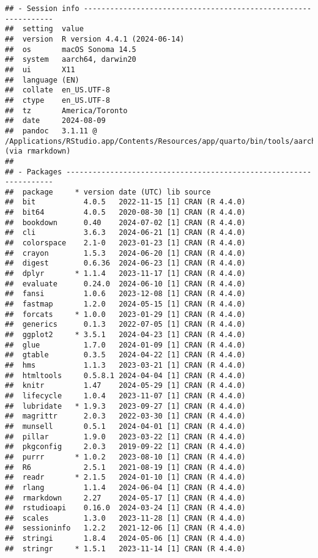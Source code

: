 \documentclass[
]{book}
\begin{document}
\begin{verbatim}
## - Session info ---------------------------------------------------------------
##  setting  value
##  version  R version 4.4.1 (2024-06-14)
##  os       macOS Sonoma 14.5
##  system   aarch64, darwin20
##  ui       X11
##  language (EN)
##  collate  en_US.UTF-8
##  ctype    en_US.UTF-8
##  tz       America/Toronto
##  date     2024-08-09
##  pandoc   3.1.11 @ /Applications/RStudio.app/Contents/Resources/app/quarto/bin/tools/aarch64/ (via rmarkdown)
## 
## - Packages -------------------------------------------------------------------
##  package     * version date (UTC) lib source
##  bit           4.0.5   2022-11-15 [1] CRAN (R 4.4.0)
##  bit64         4.0.5   2020-08-30 [1] CRAN (R 4.4.0)
##  bookdown      0.40    2024-07-02 [1] CRAN (R 4.4.0)
##  cli           3.6.3   2024-06-21 [1] CRAN (R 4.4.0)
##  colorspace    2.1-0   2023-01-23 [1] CRAN (R 4.4.0)
##  crayon        1.5.3   2024-06-20 [1] CRAN (R 4.4.0)
##  digest        0.6.36  2024-06-23 [1] CRAN (R 4.4.0)
##  dplyr       * 1.1.4   2023-11-17 [1] CRAN (R 4.4.0)
##  evaluate      0.24.0  2024-06-10 [1] CRAN (R 4.4.0)
##  fansi         1.0.6   2023-12-08 [1] CRAN (R 4.4.0)
##  fastmap       1.2.0   2024-05-15 [1] CRAN (R 4.4.0)
##  forcats     * 1.0.0   2023-01-29 [1] CRAN (R 4.4.0)
##  generics      0.1.3   2022-07-05 [1] CRAN (R 4.4.0)
##  ggplot2     * 3.5.1   2024-04-23 [1] CRAN (R 4.4.0)
##  glue          1.7.0   2024-01-09 [1] CRAN (R 4.4.0)
##  gtable        0.3.5   2024-04-22 [1] CRAN (R 4.4.0)
##  hms           1.1.3   2023-03-21 [1] CRAN (R 4.4.0)
##  htmltools     0.5.8.1 2024-04-04 [1] CRAN (R 4.4.0)
##  knitr         1.47    2024-05-29 [1] CRAN (R 4.4.0)
##  lifecycle     1.0.4   2023-11-07 [1] CRAN (R 4.4.0)
##  lubridate   * 1.9.3   2023-09-27 [1] CRAN (R 4.4.0)
##  magrittr      2.0.3   2022-03-30 [1] CRAN (R 4.4.0)
##  munsell       0.5.1   2024-04-01 [1] CRAN (R 4.4.0)
##  pillar        1.9.0   2023-03-22 [1] CRAN (R 4.4.0)
##  pkgconfig     2.0.3   2019-09-22 [1] CRAN (R 4.4.0)
##  purrr       * 1.0.2   2023-08-10 [1] CRAN (R 4.4.0)
##  R6            2.5.1   2021-08-19 [1] CRAN (R 4.4.0)
##  readr       * 2.1.5   2024-01-10 [1] CRAN (R 4.4.0)
##  rlang         1.1.4   2024-06-04 [1] CRAN (R 4.4.0)
##  rmarkdown     2.27    2024-05-17 [1] CRAN (R 4.4.0)
##  rstudioapi    0.16.0  2024-03-24 [1] CRAN (R 4.4.0)
##  scales        1.3.0   2023-11-28 [1] CRAN (R 4.4.0)
##  sessioninfo   1.2.2   2021-12-06 [1] CRAN (R 4.4.0)
##  stringi       1.8.4   2024-05-06 [1] CRAN (R 4.4.0)
##  stringr     * 1.5.1   2023-11-14 [1] CRAN (R 4.4.0)

\end{verbatim}
\end{document}
